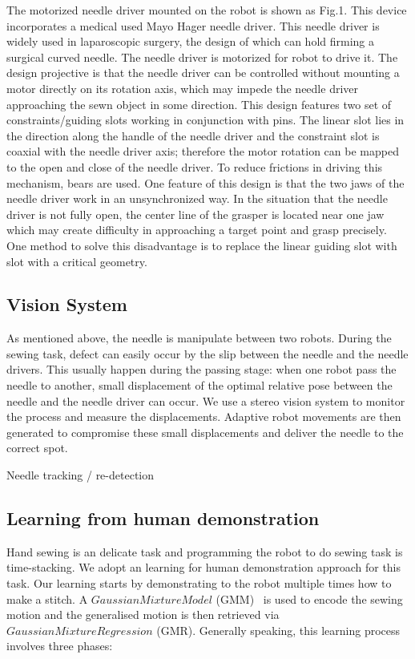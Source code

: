 The motorized needle driver mounted on the robot is shown as Fig.1. This device incorporates a medical used Mayo Hager needle driver. This needle driver is widely used in laparoscopic surgery, the design of which can hold firming a surgical curved needle. The needle driver is motorized for robot to drive it. The design projective is that the needle driver can be controlled without mounting a motor directly on its rotation axis, which may impede the needle driver approaching the sewn object in some direction. This design features two set of constraints/guiding slots working in conjunction with pins. The linear slot lies in the direction along the handle of the needle driver and the constraint slot is coaxial with the needle driver axis; therefore the motor rotation can be mapped to the open and close of the needle driver. To reduce frictions in driving this mechanism, bears are used. One feature of this design is that the two jaws of the needle driver work in an unsynchronized way. In the situation that the needle driver is not fully open, the center line of the grasper is located near one jaw which may create difficulty in approaching a target point and grasp precisely. One method to solve this disadvantage is to replace the linear guiding slot with slot with a critical geometry.

\subsection{Vision System}
As mentioned above, the needle is manipulate between two robots. During the sewing task, defect can easily occur by the slip between the needle and the needle drivers. This usually happen during the passing stage: when one robot pass the needle to another, small displacement of the optimal relative pose between the needle and the needle driver can occur. We use a stereo vision system to monitor the process and measure the displacements. Adaptive robot movements are then generated to compromise these small displacements and deliver the needle to the correct spot.

Needle tracking / re-detection

\subsection{Learning from human demonstration}
Hand sewing is an delicate task and programming the robot to do sewing task is time-stacking. We adopt an learning for human demonstration approach for this task. Our learning starts by demonstrating to the robot multiple times how to make a stitch. A $Gaussian Mixture Model$ (GMM)~\cite{cohn1996active} is used to encode the sewing motion and the generalised motion is then retrieved via $Gaussian Mixture Regression$ (GMR). Generally speaking, this learning process involves three phases:

